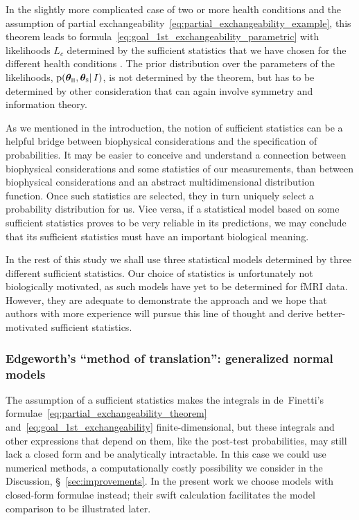 \documentclass[%
]{frontiersSCNS-nologo} %
\newcommand*{\sect}{\S} %
\newcommand*{\pf}{\mathrm{p}}%
\renewcommand*{\|}{\mathpunct{|}}%
\newcommand*{\yh}{c}
\newcommand*{\yhu}{\textsc{h}}
\newcommand*{\yhd}{\textsc{s}}
\newcommand*{\yI}{I}
\newcommand*{\yth}{\bm{\theta}}
\newcommand*{\ythh}{\yth_{\yhu}}
\newcommand*{\yths}{\yth_{\yhd}}
\newcommand*{\yL}{L}
\begin{document}
In the slightly more complicated case of two or more health conditions and
the assumption of partial
exchangeability~\eqref{eq:partial_exchangeability_example}, this theorem
leads to formula~\eqref{eq:goal_1st_exchangeability_parametric} with
likelihoods $\yL_{\yh}$ determined by the sufficient statistics that we
have chosen for the different health conditions
\citep[\sect~4.6]{bernardoetal1994_r2000}. The prior distribution over the
parameters of the likelihoods, $\pf(\ythh,\yths \| \yI)$, is not determined
by the theorem, but has to be determined by other consideration that can
again involve symmetry and information theory.

As we mentioned in the introduction, the notion of sufficient statistics
can be a helpful bridge between biophysical considerations and the
specification of probabilities. It may be easier to conceive and understand
a connection between biophysical considerations and some statistics of our
measurements, than between biophysical considerations and an abstract
multidimensional distribution function. Once such statistics are selected,
they in turn uniquely select a probability distribution for us. Vice versa,
if a statistical model based on some sufficient statistics proves to be
very reliable in its predictions, we may conclude that its sufficient
statistics must have an important biological meaning.

In the rest of this study we shall use three statistical models determined by
three different sufficient statistics. Our choice of statistics is
unfortunately not biologically motivated, as such models have yet to be determined for fMRI data. However, they are adequate to demonstrate the approach and we hope that authors with more experience will pursue this
line of thought and derive better-motivated sufficient statistics.

\subsubsection{Edgeworth's \enquote{method of translation}: generalized normal
  models}
\label{sec:generalized_normals}



The assumption of a sufficient statistics makes the integrals in
de~Finetti's formulae~\eqref{eq:partial_exchangeability_theorem}
and~\eqref{eq:goal_1st_exchangeability} finite-dimensional, but these
integrals and other expressions that depend on them, like the post-test
probabilities, may still lack a closed form and be analytically
intractable. In this case we could use numerical methods, a computationally
costly possibility we consider in the Discussion,
\sect~\ref{sec:improvements}. In the present work we choose models with
closed-form formulae instead; their swift calculation facilitates the model
comparison to be illustrated later.
\end{document}
